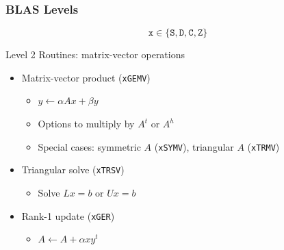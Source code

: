 \documentclass[xcolor={rgb,x11names,svgnames},rgb,x11names,svgnames]{beamer}
\newcommand{\red}{\alert}
\begin{document}

\begin{frame}[label=blas]
  \frametitle{BLAS Levels}

  \[
    \texttt{x} \in \{ \texttt{S}, \texttt{D}, \texttt{C}, \texttt{Z} \}
  \]
  
  \begin{block}{Level 2 Routines: \red{matrix-vector} operations}
    \begin{itemize}
    \item Matrix-vector product (\texttt{xGEMV}) 
      \begin{itemize}
      \item $y \gets \alpha Ax + \beta y$
      \item Options to multiply by $A^t$ or $A^h$
      \item Special cases: symmetric $A$ (\texttt{xSYMV}), triangular $A$ (\texttt{xTRMV})
      \end{itemize}

      \medskip
      
    \item Triangular solve (\texttt{xTRSV})
      \begin{itemize}
      \item Solve $Lx = b$ or $Ux = b$
      \end{itemize}

      \medskip
      
    \item Rank-1 update (\texttt{xGER})
      \begin{itemize}
      \item $A \gets A + \alpha x y^t$        
      \end{itemize}
    \end{itemize}
  \end{block}
\end{frame}

\end{document}
